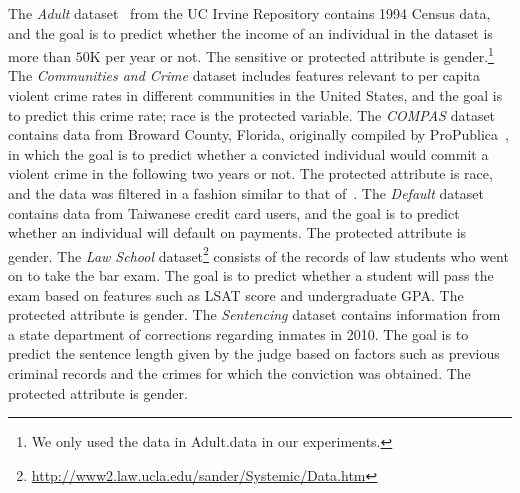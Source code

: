 The \emph{Adult} dataset~\citep{uci-repo, adult-dataset} from the UC Irvine Repository contains 1994
Census data, and the goal is to predict whether the income of an
individual in the dataset is more than $50$K per year or not. 
The sensitive or protected attribute is gender.\footnote{We only used the data in Adult.data in our experiments.}
The \emph{Communities and
  Crime} dataset \citep{uci-repo} includes features relevant to
per capita violent crime rates in different communities in the United
States, and the goal is to predict this crime
rate; race is the protected variable.
The \emph{COMPAS}
dataset contains data from Broward County, Florida, originally compiled
by ProPublica~\cite{propublica}, in which the goal is to predict
whether a convicted individual would commit a violent crime in the
following two years or not. The protected attribute 
is race, and the data was filtered in a fashion similar to that of~\citet{Corbett-DaviesP17}.
The \emph{Default}
dataset~\citep{default-dataset,uci-repo} contains data from Taiwanese
credit card users, and the goal is to predict whether an individual
will default on payments. The protected attribute is
gender.
The \emph{Law School} dataset\footnote{\url{http://www2.law.ucla.edu/sander/Systemic/Data.htm}} 
consists of the records of law students who went on to take the bar exam. The goal is to 
predict whether a student will pass the exam based on features such as LSAT score and 
undergraduate GPA. The protected attribute is gender. 
The \emph{Sentencing} dataset contains information from a state department
of corrections regarding inmates in 2010. The goal is
to predict the sentence length given by the judge based on factors
such as previous criminal records and the crimes for which the
conviction was obtained. The protected attribute is gender.



